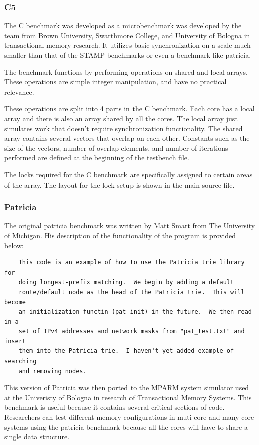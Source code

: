 \documentclass{article}
\begin{document}
\subsubsection{C5}

The C benchmark was developed as a microbenchmark was developed by the team
from Brown University, Swarthmore College, and University of Bologna in 
transactional memory research. It utilizes basic synchronization on a scale 
much smaller than that of the STAMP benchmarks or even a benchmark like 
patricia.

The benchmark functions by performing operations on shared and local arrays. 
These operations are simple integer manipulation, and have no practical 
relevance. 

These operations are split into 4 parts in the C benchmark. Each core has a 
local array and there is also an array shared by all the cores. The local 
array just simulates work that doesn't require synchronization functionality. 
The shared array contains several vectors that overlap on each other. 
Constants such as the size of the vectors, number of overlap elements, and 
number of iterations performed are defined at the beginning of the testbench
 file. 

The locks required for the C benchmark are specifically assigned to certain 
areas of the array. The layout for the lock setup is shown in the main source 
file.

\subsubsection{Patricia}

The original patricia benchmark was written by Matt Smart from The University of
 Michigan. His description of the functionality of the program is provided
below:

\begin{verbatim}
    This code is an example of how to use the Patricia trie library for
    doing longest-prefix matching.  We begin by adding a default
    route/default node as the head of the Patricia trie.  This will become
    an initialization functin (pat_init) in the future.  We then read in a
    set of IPv4 addresses and network masks from "pat_test.txt" and insert
    them into the Patricia trie.  I haven't yet added example of searching
    and removing nodes.
\end{verbatim}

This version of Patricia was then ported to the MPARM system simulator used at 
the Univeristy of Bologna in research of Transactional Memory Systems. This
benchmark is useful because it contains several critical sections of code. 
Researchers can test different memory configurations in muti-core and many-core 
systems using the patricia benchmark because all the cores will have to share a 
single data structure. 
\end{document}
